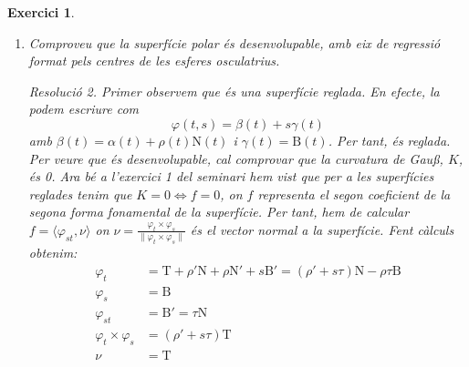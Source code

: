 \documentclass[10pt,a4paper]{article}
\newcommand{\vf}[1]{\boldsymbol{\mathrm{#1}}} %
\newtheorem{exercice}{Exercici}
\theoremstyle{remark}
\newtheorem*{resolution}{Resolució}
\theoremstyle{math}
\begin{document}
\begin{exercice}
\begin{enumerate}
\begin{resolution}
\begin{align*}
                                                             & =2\langle k'(t_0)\vf{N}(t_0)-{k(t_0)}^2\vf{T}(t_0)-k(t_0)\tau(t_0)\vf{B}(t_0),-\rho(t_0)\vf{N}(t_0) - s\vf{B}(t_0)\rangle \\
                                                             & =-2 k'(t_0)\rho(t_0)+2k(t_0)\tau(t_0)s                                                                                    \\
                                                             & =-2\left[ k'(t_0)\rho(t_0)-k(t_0)\tau(t_0)s\right]
            \end{align*}
            que només s'anu\lgem a en el cas de ser $\tilde{S}_s$ l'esfera osculatriu ($s=\frac{\rho'(t_0)}{\tau(t_0)}$). Per tant, en general les esferes $\tilde{S}_s$ tenen ordre de contacte exactament 2.
          \end{resolution}
    \item Comproveu que la superfície polar és desenvolupable, amb eix de regressió format pels centres de les esferes osculatrius.
          \begin{resolution}
            Primer observem que és una superfície reglada. En efecte, la podem escriure com $$\varphi(t,s)=\beta(t)+s\gamma(t)$$ amb $\beta(t)=\alpha(t) + \rho(t)\vf{N}(t)$ i $\gamma(t)=\vf{B}(t)$. Per tant, és reglada. Per veure que és desenvolupable, cal comprovar que la curvatura de Gau\ss, $K$, és 0. Ara bé a l'exercici 1 del seminari hem vist que per a les superfícies reglades tenim que $K=0\iff f=0$, on $f$ representa el segon coeficient de la segona forma fonamental de la superfície. Per tant, hem de calcular $f=\langle\varphi_{st},\nu\rangle$ on $\nu=\frac{\varphi_t\times\varphi_s}{\|\varphi_t\times\varphi_s\|}$ és el vector normal a la superfície. Fent càlculs obtenim:
            \begin{align*}
              \varphi_t                & =\vf{T}+\rho'\vf{N}+\rho\vf{N}'+s\vf{B}'=(\rho'+s\tau)\vf{N}-\rho\tau\vf{B} \\
              \varphi_s                & =\vf{B}                                                                     \\
              \varphi_{st}             & =\vf{B}'=\tau\vf{N}                                                         \\
              \varphi_t\times\varphi_s & =(\rho'+s\tau)\vf{T}                                                        \\
              \nu                      & =\vf{T}
            \end{align*}

\end{resolution}
\end{enumerate}
\end{exercice}
\end{document}
